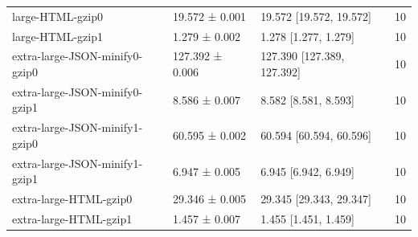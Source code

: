\begin{tabular}{lllr}
large-HTML-gzip0 & 19.572 ± 0.001 & 19.572 [19.572, 19.572] & 10 \\
large-HTML-gzip1 & 1.279 ± 0.002 & 1.278 [1.277, 1.279] & 10 \\
extra-large-JSON-minify0-gzip0 & 127.392 ± 0.006 & 127.390 [127.389, 127.392] & 10 \\
extra-large-JSON-minify0-gzip1 & 8.586 ± 0.007 & 8.582 [8.581, 8.593] & 10 \\
extra-large-JSON-minify1-gzip0 & 60.595 ± 0.002 & 60.594 [60.594, 60.596] & 10 \\
extra-large-JSON-minify1-gzip1 & 6.947 ± 0.005 & 6.945 [6.942, 6.949] & 10 \\
extra-large-HTML-gzip0 & 29.346 ± 0.005 & 29.345 [29.343, 29.347] & 10 \\
extra-large-HTML-gzip1 & 1.457 ± 0.007 & 1.455 [1.451, 1.459] & 10 \\
\bottomrule
\end{tabular}

